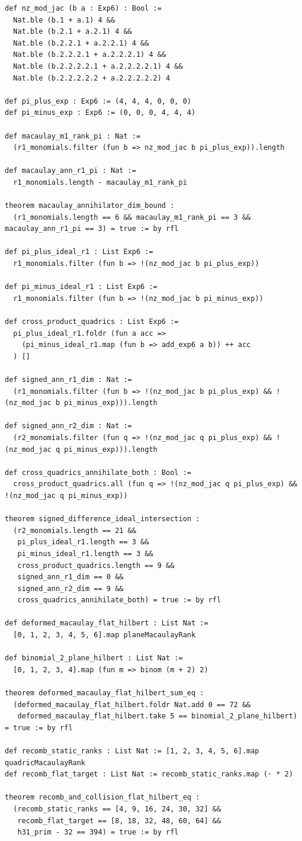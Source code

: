 \documentclass[11pt,a4paper]{article}
\begin{document}
\begin{lstlisting}[caption={Ideal intersection, annihilator bounds, and flat Hilbert family certifications in \texttt{HodgeVerification.lean}.}]
def nz_mod_jac (b a : Exp6) : Bool :=
  Nat.ble (b.1 + a.1) 4 &&
  Nat.ble (b.2.1 + a.2.1) 4 &&
  Nat.ble (b.2.2.1 + a.2.2.1) 4 &&
  Nat.ble (b.2.2.2.1 + a.2.2.2.1) 4 &&
  Nat.ble (b.2.2.2.2.1 + a.2.2.2.2.1) 4 &&
  Nat.ble (b.2.2.2.2.2 + a.2.2.2.2.2) 4

def pi_plus_exp : Exp6 := (4, 4, 4, 0, 0, 0)
def pi_minus_exp : Exp6 := (0, 0, 0, 4, 4, 4)

def macaulay_m1_rank_pi : Nat :=
  (r1_monomials.filter (fun b => nz_mod_jac b pi_plus_exp)).length

def macaulay_ann_r1_pi : Nat :=
  r1_monomials.length - macaulay_m1_rank_pi

theorem macaulay_annihilator_dim_bound :
  (r1_monomials.length == 6 && macaulay_m1_rank_pi == 3 && macaulay_ann_r1_pi == 3) = true := by rfl

def pi_plus_ideal_r1 : List Exp6 :=
  r1_monomials.filter (fun b => !(nz_mod_jac b pi_plus_exp))

def pi_minus_ideal_r1 : List Exp6 :=
  r1_monomials.filter (fun b => !(nz_mod_jac b pi_minus_exp))

def cross_product_quadrics : List Exp6 :=
  pi_plus_ideal_r1.foldr (fun a acc =>
    (pi_minus_ideal_r1.map (fun b => add_exp6 a b)) ++ acc
  ) []

def signed_ann_r1_dim : Nat :=
  (r1_monomials.filter (fun b => !(nz_mod_jac b pi_plus_exp) && !(nz_mod_jac b pi_minus_exp))).length

def signed_ann_r2_dim : Nat :=
  (r2_monomials.filter (fun q => !(nz_mod_jac q pi_plus_exp) && !(nz_mod_jac q pi_minus_exp))).length

def cross_quadrics_annihilate_both : Bool :=
  cross_product_quadrics.all (fun q => !(nz_mod_jac q pi_plus_exp) && !(nz_mod_jac q pi_minus_exp))

theorem signed_difference_ideal_intersection :
  (r2_monomials.length == 21 &&
   pi_plus_ideal_r1.length == 3 &&
   pi_minus_ideal_r1.length == 3 &&
   cross_product_quadrics.length == 9 &&
   signed_ann_r1_dim == 0 &&
   signed_ann_r2_dim == 9 &&
   cross_quadrics_annihilate_both) = true := by rfl

def deformed_macaulay_flat_hilbert : List Nat :=
  [0, 1, 2, 3, 4, 5, 6].map planeMacaulayRank

def binomial_2_plane_hilbert : List Nat :=
  [0, 1, 2, 3, 4].map (fun m => binom (m + 2) 2)

theorem deformed_macaulay_flat_hilbert_sum_eq :
  (deformed_macaulay_flat_hilbert.foldr Nat.add 0 == 72 &&
   deformed_macaulay_flat_hilbert.take 5 == binomial_2_plane_hilbert) = true := by rfl

def recomb_static_ranks : List Nat := [1, 2, 3, 4, 5, 6].map quadricMacaulayRank
def recomb_flat_target : List Nat := recomb_static_ranks.map (· * 2)

theorem recomb_and_collision_flat_hilbert_eq :
  (recomb_static_ranks == [4, 9, 16, 24, 30, 32] &&
   recomb_flat_target == [8, 18, 32, 48, 60, 64] &&
   h31_prim - 32 == 394) = true := by rfl
\end{lstlisting}
\end{document}

